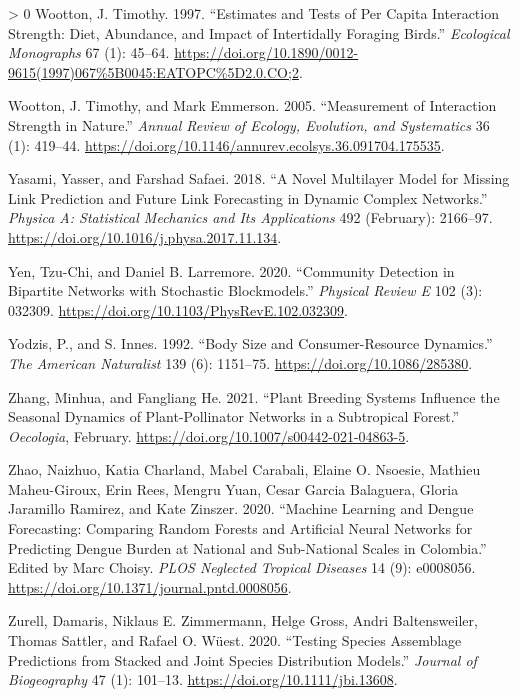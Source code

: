 \documentclass[10pt,oneside]{article}
\newlength{\cslhangindent}
\newenvironment{CSLReferences}[3] %
 {%
  \setlength{\parindent}{0pt}
  \ifodd #1 \everypar{\setlength{\hangindent}{\cslhangindent}}\ignorespaces\fi
  \ifnum #2 > 0
  \setlength{\parskip}{#2\baselineskip}
  \fi
 }%
 {}
\begin{document}
\begin{CSLReferences}{1}{0}
\leavevmode\hypertarget{ref-Wootton1997EstTes}{}%
Wootton, J. Timothy. 1997. {``Estimates and Tests of Per Capita
Interaction Strength: Diet, Abundance, and Impact of Intertidally
Foraging Birds.''} \emph{Ecological Monographs} 67 (1): 45--64.
\url{https://doi.org/10.1890/0012-9615(1997)067\%5B0045:EATOPC\%5D2.0.CO;2}.

\leavevmode\hypertarget{ref-Wootton2005MeaInt}{}%
Wootton, J. Timothy, and Mark Emmerson. 2005. {``Measurement of
Interaction Strength in Nature.''} \emph{Annual Review of Ecology,
Evolution, and Systematics} 36 (1): 419--44.
\url{https://doi.org/10.1146/annurev.ecolsys.36.091704.175535}.

\leavevmode\hypertarget{ref-Yasami2018NovMul}{}%
Yasami, Yasser, and Farshad Safaei. 2018. {``A Novel Multilayer Model
for Missing Link Prediction and Future Link Forecasting in Dynamic
Complex Networks.''} \emph{Physica A: Statistical Mechanics and Its
Applications} 492 (February): 2166--97.
\url{https://doi.org/10.1016/j.physa.2017.11.134}.

\leavevmode\hypertarget{ref-Yen2020ComDet}{}%
Yen, Tzu-Chi, and Daniel B. Larremore. 2020. {``Community Detection in
Bipartite Networks with Stochastic Blockmodels.''} \emph{Physical Review
E} 102 (3): 032309. \url{https://doi.org/10.1103/PhysRevE.102.032309}.

\leavevmode\hypertarget{ref-Yodzis1992BodSiz}{}%
Yodzis, P., and S. Innes. 1992. {``Body Size and Consumer-Resource
Dynamics.''} \emph{The American Naturalist} 139 (6): 1151--75.
\url{https://doi.org/10.1086/285380}.

\leavevmode\hypertarget{ref-Zhang2021PlaBre}{}%
Zhang, Minhua, and Fangliang He. 2021. {``Plant Breeding Systems
Influence the Seasonal Dynamics of Plant-Pollinator Networks in a
Subtropical Forest.''} \emph{Oecologia}, February.
\url{https://doi.org/10.1007/s00442-021-04863-5}.

\leavevmode\hypertarget{ref-Zhao2020MacLea}{}%
Zhao, Naizhuo, Katia Charland, Mabel Carabali, Elaine O. Nsoesie,
Mathieu Maheu-Giroux, Erin Rees, Mengru Yuan, Cesar Garcia Balaguera,
Gloria Jaramillo Ramirez, and Kate Zinszer. 2020. {``Machine Learning
and Dengue Forecasting: Comparing Random Forests and Artificial Neural
Networks for Predicting Dengue Burden at National and Sub-National
Scales in Colombia.''} Edited by Marc Choisy. \emph{PLOS Neglected
Tropical Diseases} 14 (9): e0008056.
\url{https://doi.org/10.1371/journal.pntd.0008056}.

\leavevmode\hypertarget{ref-Zurell2020TesSpe}{}%
Zurell, Damaris, Niklaus E. Zimmermann, Helge Gross, Andri
Baltensweiler, Thomas Sattler, and Rafael O. Wüest. 2020. {``Testing
Species Assemblage Predictions from Stacked and Joint Species
Distribution Models.''} \emph{Journal of Biogeography} 47 (1): 101--13.
\url{https://doi.org/10.1111/jbi.13608}.

\end{CSLReferences}
\end{document}

